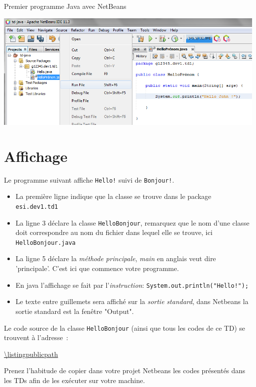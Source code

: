 \documentclass[a4paper,11pt]{style-esi/td}
\begin{document}
\begin{Tutoriel}{Premier programme Java avec NetBeans}
\begin{steps}
		\begin{center}
			\includegraphics[width=.9\textwidth]{images/anb113_newproject_run_othermain}
		\end{center}

	\end{steps}

\end{Tutoriel}
\newpage
\section{Affichage}

Le programme suivant affiche \texttt{Hello!} suivi de \texttt{Bonjour!}.

\begin{itemize}
	\item La première ligne indique que la classe se trouve dans le package \texttt{esi.dev1.td1}
	\item La ligne 3 déclare la classe \texttt{HelloBonjour}, remarquez que le nom d'une classe
	      doit correspondre au nom du fichier dans lequel elle se trouve, ici \texttt{HelloBonjour.java}
	\item La ligne 5 déclare la \emph{méthode principale}, \emph{main} en anglais veut dire 'principale'.
	      C'est ici que commence votre programme.
	\item En java l'affichage se fait par l'\emph{instruction}: \texttt{System.out.println("Hello!");}
	\item Le texte entre guillemets sera affiché sur la \emph{sortie standard}, dans Netbeans la
	      sortie standard est la fenêtre "Output".
\end{itemize}

Le code source de la classe \texttt{HelloBonjour} (ainsi que tous les codes de ce TD) se trouvent à l'adresse~:

\url{\listingpublicpath}

Prenez l'habitude de copier dans votre projet Netbeans les codes présentés dans les TDs afin de
les exécuter sur votre machine.
\end{document}
